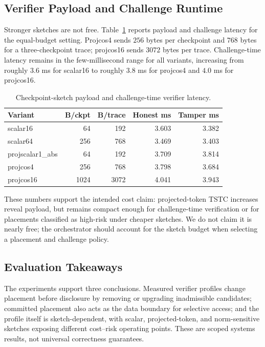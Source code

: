 \documentclass[sigplan,screen,review,anonymous]{acmart}
\begin{document}
\subsection{Verifier Payload and Challenge Runtime}
\label{subsec:eval-overhead}

Stronger sketches are not free. Table~\ref{tab:verifier-overhead} reports
payload and challenge latency for the equal-budget setting. Projcos4 sends
\(256\) bytes per checkpoint and \(768\) bytes for a three-checkpoint trace;
projcos16 sends \(3072\) bytes per trace. Challenge-time latency remains in
the few-millisecond range for all variants, increasing from roughly \(3.6\) ms
for scalar16 to roughly \(3.8\) ms for projcos4 and \(4.0\) ms for projcos16.

\begin{table}[!t]
\centering
\caption{Checkpoint-sketch payload and challenge-time verifier latency.}
\label{tab:verifier-overhead}
\scriptsize
\setlength{\tabcolsep}{3pt}
\begin{tabular}{lrrrr}
\toprule
\textbf{Variant} & \textbf{B/ckpt} & \textbf{B/trace} & \textbf{Honest ms} & \textbf{Tamper ms} \\
\midrule
scalar16 & 64 & 192 & 3.603 & 3.382 \\
scalar64 & 256 & 768 & 3.469 & 3.403 \\
projscalar1\_abs & 64 & 192 & 3.709 & 3.814 \\
projcos4 & 256 & 768 & 3.798 & 3.684 \\
projcos16 & 1024 & 3072 & 4.041 & 3.943 \\
\bottomrule
\end{tabular}
\end{table}

These numbers support the intended cost claim: projected-token TSTC increases
reveal payload, but remains compact enough for challenge-time verification or
for placements classified as high-risk under cheaper sketches. We do not
claim it is nearly free; the orchestrator should account for the sketch budget
when selecting a placement and challenge policy.

\subsection{Evaluation Takeaways}
\label{subsec:eval-takeaways}

The experiments support three conclusions. Measured verifier profiles change
placement before disclosure by removing or upgrading inadmissible candidates;
committed placement also acts as the data boundary for selective access; and
the profile itself is sketch-dependent, with scalar, projected-token, and
norm-sensitive sketches exposing different cost--risk operating points. These
are scoped systems results, not universal correctness guarantees.
\end{document}
